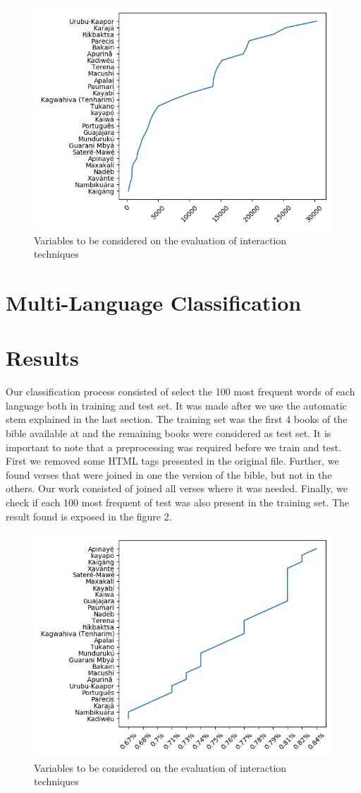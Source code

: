 \documentclass[12pt]{article}
\begin{document}
\begin{figure}[h!]
\centering
\includegraphics[width=.7\textwidth]{images/fig1.png}
\caption{Variables to be considered on the evaluation of interaction
techniques}
\label{fig:Fig1}
\end{figure}


\section{Multi-Language Classification}\label{sec:multi-language-classification}



\section{Results}\label{sec:results}

Our classification process consisted of select the 100 most frequent words of each language both in training and test set.
It was made after we use the automatic stem explained in the last section.
The training set was the first 4 books of the bible available at
\cite{angelo} and the remaining books were considered as test set.
It is important to note that a preprocessing was required before we train and test.
First we removed some HTML tags presented in the original file.
Further, we found verses that were joined in one the version of the bible, but not in the others.
Our work consisted of joined all verses where it was needed.
Finally, we check if each 100 most frequent of test was also present in the training set.
The result found is exposed in the figure 2.


\begin{figure}[h!]
\centering
\includegraphics[width=.7\textwidth]{images/fig2.png}
\caption{Variables to be considered on the evaluation of interaction
techniques}
\label{fig:Fig2}
\end{figure}
\end{document}
